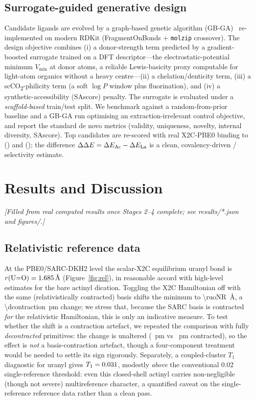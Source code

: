 \documentclass[journal=jcisd8,manuscript=article]{achemso}
\begin{document}
\subsection{Surrogate-guided generative design}
Candidate ligands are evolved by a graph-based genetic algorithm
(GB-GA)~\cite{Jensen2019} re-implemented on modern RDKit (FragmentOnBonds +
\texttt{molzip} crossover). The design objective combines (i) a donor-strength term
predicted by a gradient-boosted surrogate trained on a DFT descriptor---the
electrostatic-potential minimum \(V_{\min}\) at donor atoms, a reliable Lewis-basicity
proxy computable for light-atom organics without a heavy centre---(ii) a chelation/denticity
term, (iii) a scCO\textsubscript{2}-philicity term (a soft \(\log P\) window plus
fluorination), and (iv) a synthetic-accessibility (SAscore) penalty. The surrogate is
evaluated under a \emph{scaffold-based} train/test split. We benchmark against a
random-from-prior baseline and a GB-GA run optimising an extraction-irrelevant
control objective, and report the standard de novo metrics (validity, uniqueness,
novelty, internal diversity, SAscore). Top candidates are re-scored with real
X2C-PBE0 binding to  () and  (); the
difference \(\Delta\Delta E=\Delta E_{\ce{Ac}}-\Delta E_{\ce{La}}\) is a clean,
covalency-driven / selectivity estimate.

\section{Results and Discussion}
\emph{[Filled from real computed results once Stages 2--4 complete; see
results/*.json and figures/.]}

\subsection{Relativistic reference data}
At the PBE0/SARC-DKH2 level the scalar-X2C equilibrium uranyl bond is
\(r(\ce{U=O})=\SI{\ruoX}{\angstrom}\) (Figure~\ref{fig:rel}), in reasonable accord
with high-level estimates for the bare actinyl dication. Toggling the X2C
Hamiltonian off with the same (relativistically contracted) basis shifts the
minimum to \SI{\ruoNR}{\angstrom}, a \SI{\dcontraction}{pm} change; we stress that,
because the SARC basis is contracted \emph{for} the relativistic Hamiltonian, this
is only an indicative measure. To test whether the shift is a contraction
artefact, we repeated the comparison with fully \emph{decontracted} primitives: the
change is unaltered (\dconPM~pm vs \dconConPM~pm contracted), so the effect is
\emph{not} a basis-contraction artefact, though a four-component treatment would be
needed to settle its sign rigorously. Separately, a coupled-cluster \(T_1\)
diagnostic for uranyl gives \(T_1=0.031\), modestly \emph{above} the conventional
0.02 single-reference threshold: even this closed-shell  actinyl carries
non-negligible (though not severe) multireference character, a quantified caveat on
the single-reference reference data rather than a clean pass.
\end{document}
